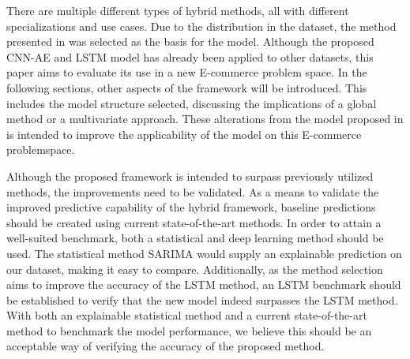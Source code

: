 

There are multiple different types of hybrid methods, all with different specializations and use cases.
Due to the distribution in the dataset, the method presented in \cite{Zhao2019} was selected as the basis for the model.
Although the proposed CNN-AE and LSTM model has already been applied to other datasets, this paper aims to evaluate its use in a new E-commerce problem space.
In the following sections, other aspects of the framework will be introduced.
This includes the model structure selected, discussing the implications of a global method or a multivariate approach.
These alterations from the model proposed in \cite{Zhao2019} is intended to improve the applicability of the model on this E-commerce problemspace.


Although the proposed framework is intended to surpass previously utilized methods,
the improvements need to be validated.
As a means to validate the improved predictive capability of the hybrid framework,
baseline predictions should be created using current state-of-the-art methods.
In order to attain a well-suited benchmark, both a statistical and deep learning method should be used.
The statistical method SARIMA would supply an explainable prediction on our dataset, making it easy to compare.
Additionally, as the method selection aims to improve the accuracy of the LSTM method,
an LSTM benchmark should be established to verify that the new model indeed surpasses the LSTM method.
With both an explainable statistical method and a current state-of-the-art method to benchmark the model performance,
we believe this should be an acceptable way of verifying the accuracy of the proposed method.

